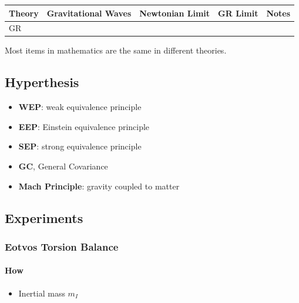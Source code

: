 \documentclass[letterpaper,10pt,english]{sphinxmanual}
\begin{document}
{\begin{itemize}
\end{itemize}

\begin{tabulary}{\linewidth}{|L|L|L|L|L|}
\hline
\textsf{\relax 
Theory
} & \textsf{\relax 
Gravitational Waves
} & \textsf{\relax 
Newtonian Limit
} & \textsf{\relax 
GR Limit
} & \textsf{\relax 
Notes
}\\
\hline
GR
 &  &  &  & \\
\hline\end{tabulary}


Most items in mathematics are the same in different theories.


\subsection{Hyperthesis}
\label{GeneralRelativityAdv:hyperthesis}\begin{itemize}
\item {} 
\textbf{WEP}: weak equivalence principle

\item {} 
\textbf{EEP}: Einstein equivalence principle

\item {} 
\textbf{SEP}: strong equivalence principle

\item {} 
\textbf{GC}, General Covariance

\item {} 
\textbf{Mach Principle}: gravity coupled to matter

\end{itemize}


\subsection{Experiments}
\label{GeneralRelativityAdv:experiments}

\subsubsection{Eotvos Torsion Balance}
\label{GeneralRelativityAdv:eotvos-torsion-balance}

\paragraph{How}
\label{GeneralRelativityAdv:how}\begin{itemize}
\item {} 
Inertial mass $m_I$


\end{itemize}}
\end{document}
